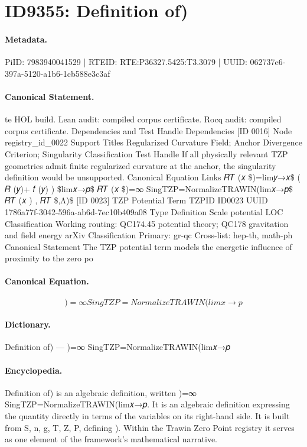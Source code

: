 \section*{ID9355: Definition of)}
\paragraph{Metadata.}
PiID: 7983940041529 | RTEID: RTE:P36327.5425:T3.3079 | UUID: 062737e6-397a-5120-a1b6-1cb588e3c3af

\paragraph{Canonical Statement.}
te HOL build. Lean audit: compiled corpus certificate. Rocq audit: compiled corpus certificate. Dependencies and Test Handle Dependencies [ID 0016] Node registry\_id\_0022 Support Titles Regularized Curvature Field; Anchor Divergence Criterion; Singularity Classification Test Handle If all physically relevant TZP geometries admit finite regularized curvature at the anchor, the singularity definition would be unsupported. Canonical Equation Links 𝑅𝑇 (𝑥 \$)=lim𝑦→𝑥\$ ( 𝑅 (𝑦)+ 𝑓 (𝑦) ) \$lim𝑥→𝑝\$ 𝑅𝑇 (𝑥 \$)=∞ SingTZP=NormalizeTRAWIN(lim𝑥→𝑝\$ 𝑅𝑇 (𝑥 ) , 𝑅𝑇 \$,Λ)\$ [ID 0023] TZP Potential Term TZPID ID0023 UUID 1786a77f-3042-596a-ab6d-7ec10b409a08 Type Definition Scale potential LOC Classification Working routing: QC174.45 potential theory; QC178 gravitation and field energy arXiv Classification Primary: gr-qc Cross-list: hep-th, math-ph Canonical Statement The TZP potential term models the energetic influence of proximity to the zero po

\paragraph{Canonical Equation.}
\[
)=∞ SingTZP=NormalizeTRAWIN(lim𝑥→𝑝
\]

\paragraph{Dictionary.}
Definition of) — )=∞ SingTZP=NormalizeTRAWIN(lim𝑥→𝑝

\paragraph{Encyclopedia.}
Definition of) is an algebraic definition, written )=∞ SingTZP=NormalizeTRAWIN(lim𝑥→𝑝. It is an algebraic definition expressing the quantity directly in terms of the variables on its right-hand side. It is built from S, n, g, T, Z, P, defining ). Within the Trawin Zero Point registry it serves as one element of the framework's mathematical narrative.
